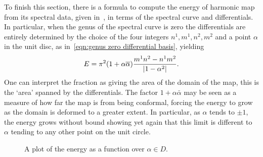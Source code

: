 \documentclass{article}
\begin{document}
To finish this section, there is a formula to compute the energy of harmonic map from its spectral data, given in~\cite[Theorem 12.17]{Hitchin1990}, in terms of the spectral curve and differentials.
In particular, when the genus of the spectral curve is zero the differentials are entirely determined by the choice of the four integers $n^1,m^1,n^2, m^2$ and a point $\alpha$ in the unit disc, as in~\eqref{eqn:genus zero differential basis}, yielding
\[
E = \pi^2(1+\alpha\overline{\alpha})\frac{m^1 n^2 - n^1 m^2}{\left|1-\alpha^2\right|}.
\]
One can interpret the fraction as giving the area of the domain of the map, this is the `area' spanned by the differentials. 
The factor $1+\alpha\bar{\alpha}$ may be seen as a measure of how far the map is from being conformal, forcing the energy to grow as the domain is deformed to a greater extent. 
In particular, as $\alpha$ tends to $\pm 1$, the energy grows without bound showing yet again that this limit is different to $\alpha$ tending to any other point on the unit circle.

\begin{figure}
\resizebox{0.5\textwidth}{!}{
\begin{tikzpicture}
\begin{axis}[
    title={$E(\alpha)$},
    xlabel=$\Real\,\alpha$, ylabel=$\Imag\,\alpha$,
]
\addplot3[
	surf,
    domain=0:0.9, %
    samples=20,
    domain y=0:360, %
    samples y=90,
    z buffer=sort,
    variable=\r,
    variable y=\t
]
(
{r*cos(t)},
{r*sin(t)},
{9*(1 + r^2)/(sqrt(1+r^2 - 2*r*cos(2*t)))}
);
\end{axis}
\end{tikzpicture}
}
\caption{A plot of the energy as a function over $\alpha \in D$.}
\end{figure}
\end{document}
